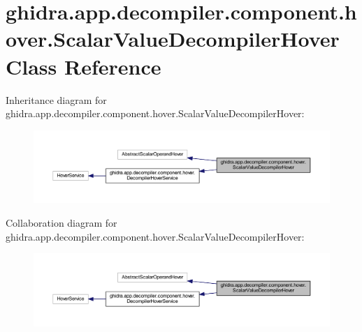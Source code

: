 \hypertarget{classghidra_1_1app_1_1decompiler_1_1component_1_1hover_1_1_scalar_value_decompiler_hover}{}\section{ghidra.\+app.\+decompiler.\+component.\+hover.\+Scalar\+Value\+Decompiler\+Hover Class Reference}
\label{classghidra_1_1app_1_1decompiler_1_1component_1_1hover_1_1_scalar_value_decompiler_hover}


Inheritance diagram for ghidra.\+app.\+decompiler.\+component.\+hover.\+Scalar\+Value\+Decompiler\+Hover\+:
\nopagebreak
\begin{figure}[H]
\begin{center}
\leavevmode
\includegraphics[width=350pt]{classghidra_1_1app_1_1decompiler_1_1component_1_1hover_1_1_scalar_value_decompiler_hover__inherit__graph}
\end{center}
\end{figure}


Collaboration diagram for ghidra.\+app.\+decompiler.\+component.\+hover.\+Scalar\+Value\+Decompiler\+Hover\+:
\nopagebreak
\begin{figure}[H]
\begin{center}
\leavevmode
\includegraphics[width=350pt]{classghidra_1_1app_1_1decompiler_1_1component_1_1hover_1_1_scalar_value_decompiler_hover__coll__graph}
\end{center}
\end{figure}
